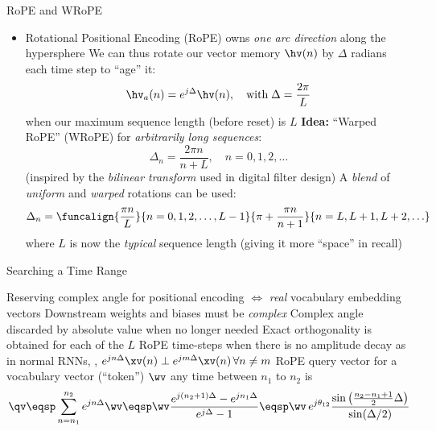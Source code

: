 \begin{slide}[\slideopts,toc={WRoPE}]{RoPE and WRoPE}

\vspace{-1em}

\begin{itemize}
\item Rotational Positional Encoding (RoPE) owns \emph{one arc direction} along the hypersphere %
  \mpitem We can thus rotate our vector memory $\hv(n)$ by $\Delta$ radians each time step to ``age'' it:
  \[
  \hv_a(n) = e^{j\Delta}\hv(n), \quad \mbox{with}\; \Delta = \frac{2\pi}{L}
  \]
  when our maximum sequence length (before reset) is $L$
  \mpitem \textbf{Idea:} ``Warped RoPE'' (WRoPE) for \emph{arbitrarily long sequences}:
  \[
  \Delta_n = \frac{2\pi n}{n+L}, \quad n=0,1,2,\ldots
  \]
  \maybepause
  (inspired by the \emph{bilinear transform} used in digital filter design)
  \mpitem A \emph{blend} of \emph{uniform} and \emph{warped} rotations can be used:
  \[
  \Delta_n = \funcalign{\frac{\pi n}{L}}{n=0,1,2,\ldots,L-1}{%
    \pi + \frac{\pi n}{n+1}}{n=L,L+1,L+2,\ldots}
  \]
  where $L$ is now the \emph{typical} sequence length (giving it more
  ``space'' in recall)
\end{itemize}
\end{slide}

\begin{slide}[\slideopts,toc={}]{Searching a Time Range}

\vspace{-1em}

\begin{itemize}
  \mpitem Reserving complex angle for positional encoding $\Leftrightarrow$ \emph{real} vocabulary
          embedding vectors
  \mpitem Downstream weights and biases must be \emph{complex}
  \mpitem Complex angle discarded by absolute value when no longer needed
  \mpitem Exact orthogonality is obtained for each of the $L$ RoPE time-steps when there is
  no amplitude decay as in normal RNNs, \ie, $e^{jn\Delta}\xv(n)\perp e^{jm\Delta}\xv(n)\, \forall n\ne m$
  \mpitem RoPE query vector for a vocabulary vector (``token'') $\wv$ any time between $n_1$ to $n_2$ is
   \[
   \qv \eqsp \sum_{n=n_1}^{n_2}e^{jn \Delta}\wv
   \eqsp \wv \frac{e^{j(n_2+1)\Delta} - e^{jn_1\Delta}}{e^{j\Delta}-1}
   \eqsp \wv\, e^{j\theta_{12}}\frac{\sin\left(\frac{n_2-n_1+1}{2}\Delta\right)}{\sin(\Delta/2)}
   \]
   \vspace{-1em}
\end{itemize}
\end{slide}

